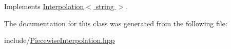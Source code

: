 Implements \hyperlink{class_interpolation_ac2e37b60de1c7b6704be643563fedd91}{Interpolation$<$ string $>$}.



The documentation for this class was generated from the following file\+:\begin{DoxyCompactItemize}
\item 
include/\hyperlink{_piecewise_interpolation_8hpp}{Piecewise\+Interpolation.\+hpp}\end{DoxyCompactItemize}
